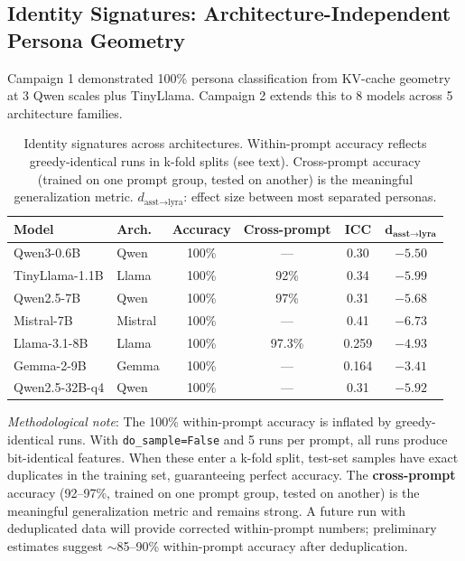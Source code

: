 \documentclass[11pt,a4paper]{article}
\begin{document}
\subsection{Identity Signatures: Architecture-Independent Persona Geometry}
\label{sec:identity}

Campaign 1 demonstrated 100\% persona classification from KV-cache geometry at 3 Qwen scales plus TinyLlama. Campaign 2 extends this to 8 models across 5 architecture families.

\begin{table}[H]
\centering
\caption{Identity signatures across architectures. Within-prompt accuracy reflects greedy-identical runs in k-fold splits (see text). Cross-prompt accuracy (trained on one prompt group, tested on another) is the meaningful generalization metric. $d_{\text{asst}\to\text{lyra}}$: effect size between most separated personas.}
\label{tab:identity}
\begin{tabular}{llcccc}
\toprule
\textbf{Model} & \textbf{Arch.} & \textbf{Accuracy} & \textbf{Cross-prompt} & \textbf{ICC} & $\bm{d_{\text{asst}\to\text{lyra}}}$ \\
\midrule
Qwen3-0.6B & Qwen & 100\% & --- & 0.30 & $-5.50$ \\
TinyLlama-1.1B & Llama & 100\% & 92\% & 0.34 & $-5.99$ \\
Qwen2.5-7B & Qwen & 100\% & 97\% & 0.31 & $-5.68$ \\
Mistral-7B & Mistral & 100\% & --- & 0.41 & $-6.73$ \\
Llama-3.1-8B & Llama & 100\% & 97.3\% & 0.259 & $-4.93$ \\
Gemma-2-9B & Gemma & 100\% & --- & 0.164 & $-3.41$ \\
Qwen2.5-32B-q4 & Qwen & 100\% & --- & 0.31 & $-5.92$ \\
\bottomrule
\end{tabular}
\end{table}

\emph{Methodological note}: The 100\% within-prompt accuracy is inflated by greedy-identical runs. With \texttt{do\_sample=False} and 5 runs per prompt, all runs produce bit-identical features. When these enter a k-fold split, test-set samples have exact duplicates in the training set, guaranteeing perfect accuracy. The \textbf{cross-prompt} accuracy (92--97\%, trained on one prompt group, tested on another) is the meaningful generalization metric and remains strong. A future run with deduplicated data will provide corrected within-prompt numbers; preliminary estimates suggest $\sim$85--90\% within-prompt accuracy after deduplication.
\end{document}
